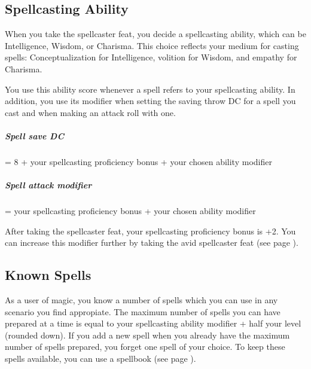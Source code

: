 



\subsection*{Spellcasting Ability}
    When you take the spellcaster feat, you decide a spellcasting ability, which can be Intelligence, Wisdom, or Charisma.
    This choice reflects your medium for casting spells: Conceptualization for Intelligence, volition for Wisdom, and empathy for Charisma.

    You use this ability score whenever a spell refers to your spellcasting ability.
    In addition, you use its modifier when setting the saving throw DC for a spell you cast and when making an attack roll with one.

    \subparagraph{Spell save DC} = 8 + your spellcasting proficiency bonus + your chosen ability modifier
    \subparagraph{Spell attack modifier} = your spellcasting proficiency bonus + your chosen ability modifier

    After taking the spellcaster feat, your spellcasting proficiency bonus is +2.
    You can increase this modifier further by taking the avid spellcaster feat (see page \pageref{feat::avidspellcaster}).

\subsection*{Known Spells}
    As a user of magic, you know a number of spells which you can use in any scenario you find appropiate.
    The maximum number of spells you can have prepared at a time is equal to your spellcasting ability modifier + half your level (rounded down).
    If you add a new spell when you already have the maximum number of spells prepared, you forget one spell of your choice.
    To keep these spells available, you can use a spellbook (see page \pageref{item::spellbook}).

